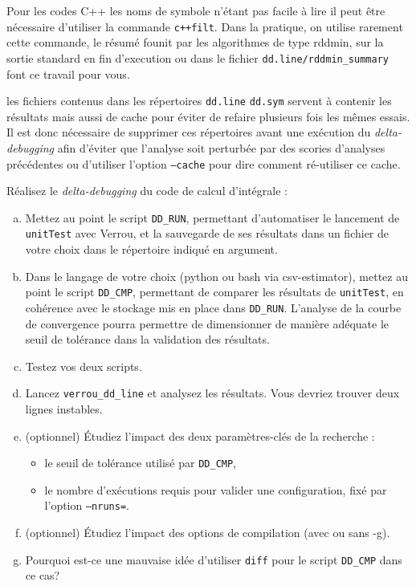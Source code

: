 \documentclass[a4paper]{article}
\newcounter{Question}
\newenvironment{question}[1][\unskip]{
  \bigskip
  \stepcounter{Question}
  \def\questionTitle{ #1}
  \begin{mdframed}[style=question]
  }{
  \end{mdframed}
}
\newenvironment{warn}[1][Attention :]{
  \begin{mdframed}[style=warning]
    \noindent{\bf #1}
}{
  \end{mdframed}
}
\begin{document}
Pour les codes C++ les noms de symbole n'étant pas facile à lire
il peut être nécessaire d'utiliser la commande \texttt{c++filt}. Dans la pratique,
on utilise rarement cette commande, 
le résumé founit par les algorithmes de type rddmin, sur la sortie standard
en fin d'execution ou dans le fichier \texttt{dd.line/rddmin\_summary} font ce travail pour vous.

\bigskip

\begin{warn}
  les fichiers contenus dans les répertoires \texttt{dd.line} \texttt{dd.sym}
  servent à contenir les résultats mais aussi de cache pour éviter de refaire plusieurs fois les mêmes essais. Il
  est donc nécessaire de supprimer ces répertoires avant une exécution du
  \textit{delta-debugging} afin d'éviter que l'analyse soit perturbée par des
  scories d'analyses précédentes ou d'utiliser l'option \texttt{--cache} pour dire comment ré-utiliser ce cache.
\end{warn}

\begin{question} Réalisez le \textit{delta-debugging} du code de calcul
  d'intégrale :
  \begin{enumerate}[(a)]
  \item Mettez au point le script \texttt{DD\_RUN}, permettant d'automatiser le
    lancement de \texttt{unitTest} avec Verrou, et la sauvegarde de ses
    résultats dans un fichier de votre choix dans le répertoire indiqué en
    argument.
  \item Dans le langage de votre choix (python ou bash via csv-estimator),
    mettez au point le script \texttt{DD\_CMP}, permettant de comparer les
    résultats de \texttt{unitTest}, en cohérence avec le stockage mis en place
    dans \texttt{DD\_RUN}. L'analyse de la courbe de convergence pourra permettre
    de dimensionner de manière adéquate le seuil de tolérance dans la validation
    des résultats.
  \item Testez vos deux scripts.
  \item Lancez \texttt{verrou\_dd\_line} et analysez les résultats. Vous devriez
    trouver deux lignes instables.
  \item (optionnel) Étudiez l'impact des deux paramètres-clés de la recherche :
    \begin{itemize}
    \item le seuil de tolérance utilisé par \texttt{DD\_CMP},
    \item le nombre d'exécutions requis pour valider une configuration, fixé par
       l'option \texttt{--nruns=}.
    \end{itemize}
  \item (optionnel) Étudiez l'impact des options de compilation (avec ou sans -g).
  \item Pourquoi est-ce une mauvaise idée d'utiliser \texttt{diff} pour le script
    \texttt{DD\_CMP} dans ce cas?
  \end{enumerate}
\end{question}
\end{document}
